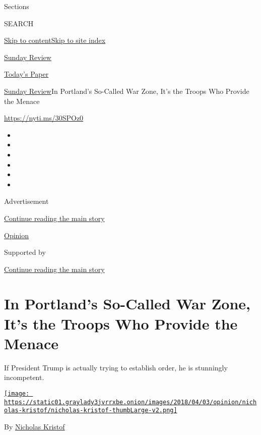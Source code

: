 Sections

SEARCH

\protect\hyperlink{site-content}{Skip to
content}\protect\hyperlink{site-index}{Skip to site index}

\href{https://www.nytimes3xbfgragh.onion/section/opinion/sunday}{Sunday
Review}

\href{https://myaccount.nytimes3xbfgragh.onion/auth/login?response_type=cookie\&client_id=vi}{}

\href{https://www.nytimes3xbfgragh.onion/section/todayspaper}{Today's
Paper}

\href{/section/opinion/sunday}{Sunday Review}\textbar{}In Portland's
So-Called War Zone, It's the Troops Who Provide the Menace

\url{https://nyti.ms/30SPOz0}

\begin{itemize}
\item
\item
\item
\item
\item
\item
\end{itemize}

Advertisement

\protect\hyperlink{after-top}{Continue reading the main story}

\href{/section/opinion}{Opinion}

Supported by

\protect\hyperlink{after-sponsor}{Continue reading the main story}

\hypertarget{in-portlands-so-called-war-zone-its-the-troops-who-provide-the-menace}{%
\section{In Portland's So-Called War Zone, It's the Troops Who Provide
the
Menace}\label{in-portlands-so-called-war-zone-its-the-troops-who-provide-the-menace}}

If President Trump is actually trying to establish order, he is
stunningly incompetent.

\href{https://www.nytimes3xbfgragh.onion/column/nicholas-kristof}{\texttt{[image: https://static01.graylady3jvrrxbe.onion/images/2018/04/03/opinion/nicholas-kristof/nicholas-kristof-thumbLarge-v2.png]}}

By
\href{https://www.nytimes3xbfgragh.onion/column/nicholas-kristof}{Nicholas
Kristof}

